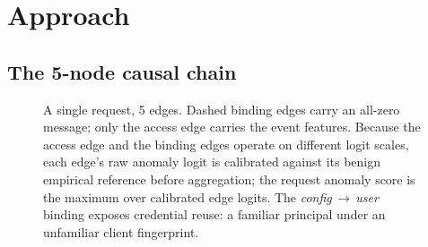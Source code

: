 \section{Approach}
\label{sec:approach}


\subsection{The 5-node causal chain}

\begin{figure}[ht!]
\centering
{}
\caption{A single request, 5 edges. Dashed binding edges carry an all-zero message; only the
access edge carries the event features. Because the access edge and the binding edges operate on
different logit scales, each edge's raw anomaly logit is calibrated against its benign empirical
reference before aggregation; the request anomaly score is the maximum over calibrated edge logits.
The \textit{config}\,$\rightarrow$\,\textit{user} binding exposes credential
reuse: a familiar principal under an unfamiliar client fingerprint.}
\label{fig:chain}
\end{figure}

